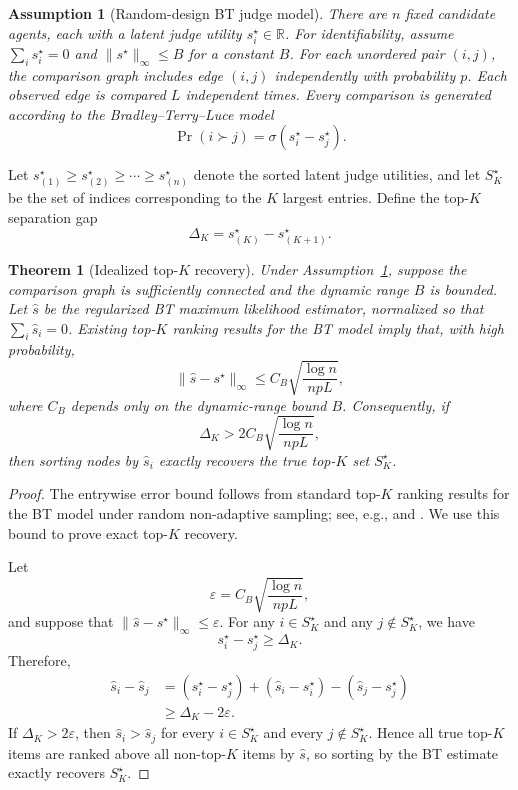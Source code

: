 \documentclass{article}
\newtheorem{assumption}{Assumption}
\newtheorem{theorem}{Theorem}
\begin{document}
\begin{assumption}[Random-design BT judge model]
\label{assump:bt}
There are $n$ fixed candidate agents, each with a latent judge utility
$s_i^\star\in\mathbb{R}$. For identifiability, assume
$\sum_i s_i^\star=0$ and $\|s^\star\|_\infty\le B$ for a constant $B$.
For each unordered pair $(i,j)$, the comparison graph includes edge $(i,j)$
independently with probability $p$. Each observed edge is compared $L$
independent times. Every comparison is generated according to the
Bradley--Terry--Luce model
\[
    \Pr(i\succ j)
    =
    \sigma(s_i^\star-s_j^\star).
\]
\end{assumption}

Let $s_{(1)}^\star\ge s_{(2)}^\star\ge\cdots\ge s_{(n)}^\star$ denote the sorted
latent judge utilities, and let $S_K^\star$ be the set of indices corresponding
to the $K$ largest entries. Define the top-$K$ separation gap
\[
    \Delta_K
    =
    s_{(K)}^\star-s_{(K+1)}^\star .
\]

\begin{theorem}[Idealized top-$K$ recovery]
\label{thm:topk_recovery}
Under Assumption~\ref{assump:bt}, suppose the comparison graph is sufficiently
connected and the dynamic range $B$ is bounded. Let $\hat s$ be the regularized
BT maximum likelihood estimator, normalized so that $\sum_i \hat s_i=0$.
Existing top-$K$ ranking results for the BT model imply that, with high
probability,
\[
    \|\hat s-s^\star\|_\infty
    \le
    C_B
    \sqrt{\frac{\log n}{npL}},
\]
where $C_B$ depends only on the dynamic-range bound $B$. Consequently, if
\[
    \Delta_K
    >
    2C_B
    \sqrt{\frac{\log n}{npL}},
\]
then sorting nodes by $\hat s_i$ exactly recovers the true top-$K$ set
$S_K^\star$.
\end{theorem}

\begin{proof}
The entrywise error bound follows from standard top-$K$ ranking results for the
BT model under random non-adaptive sampling; see, e.g.,
\citet{chen2015spectralmle} and \citet{chen2019spectralregularizedmle}. We use
this bound to prove exact top-$K$ recovery.

Let
\[
    \varepsilon
    =
    C_B
    \sqrt{\frac{\log n}{npL}},
\]
and suppose that $\|\hat s-s^\star\|_\infty\le\varepsilon$. For any
$i\in S_K^\star$ and any $j\notin S_K^\star$, we have
\[
    s_i^\star-s_j^\star
    \ge
    \Delta_K .
\]
Therefore,
\[
\begin{aligned}
    \hat s_i-\hat s_j
    &=
    (s_i^\star-s_j^\star)
    +
    (\hat s_i-s_i^\star)
    -
    (\hat s_j-s_j^\star) \\
    &\ge
    \Delta_K - 2\varepsilon .
\end{aligned}
\]
If $\Delta_K>2\varepsilon$, then $\hat s_i>\hat s_j$ for every
$i\in S_K^\star$ and every $j\notin S_K^\star$. Hence all true top-$K$ items are
ranked above all non-top-$K$ items by $\hat s$, so sorting by the BT estimate
exactly recovers $S_K^\star$.
\end{proof}
\end{document}
